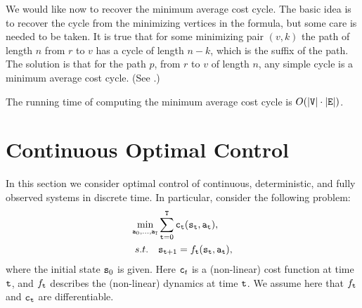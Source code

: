 We would like now to recover the minimum average cost cycle. The
basic idea is to recover the cycle from the minimizing vertices in
the formula, but some care is needed to be taken. It is true that for some
minimizing pair $(v,k)$ the path of length $n$ from $r$ to $v$ has a
cycle of length $n-k$, which is the suffix of the path. The solution
is that for the path $p$, from $r$ to $v$ of length $n$, any simple
cycle is a minimum average cost cycle. (See \cite{ChaturvediM17}.)

The running time of computing the minimum average cost cycle is
$O(|{\tt V}|\cdot |{\tt E}|)$.



\section{Continuous Optimal Control}
In this section we consider optimal control of continuous, deterministic, and fully observed systems in discrete time. 
In particular, consider the following problem:
\begin{equation}\label{eq:opt_control}
    \begin{split}
        \min_{{\tt a}_0,\dots,{\tt a}_{{\tt T}}} & \sum_{{\tt t}=0}^{\tt T} {\tt c}_{\tt t}({\tt s}_{\tt t}, {\tt a}_{\tt t}), \\
        s.t. \quad & {{\tt s}_{{\tt t} + 1}} = {f_{\tt t}}({{\tt s}_{\tt t}},{{\tt a}_{\tt t}}), 
    \end{split}
\end{equation}
where the initial state ${\tt s}_0$ is given. Here ${\tt c}_t$ is a (non-linear) cost function at time ${\tt t}$, and $f_{\tt t}$ describes the (non-linear) dynamics  at time ${\tt t}$. We assume here that $f_{\tt t}$ and ${\tt c}_{\tt t}$ are differentiable.

